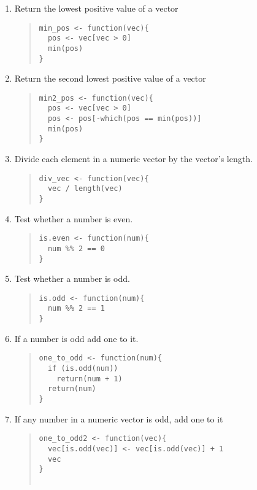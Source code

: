 \documentclass{article}
\begin{document}
\begin{enumerate}
\item Return the lowest positive value of a vector
  \begin{quote}
    \begin{verbatim}
min_pos <- function(vec){
  pos <- vec[vec > 0]
  min(pos)
}    
    \end{verbatim}
  \end{quote}

\item Return the second lowest positive value of a vector
  \begin{quote}
    \begin{verbatim}
min2_pos <- function(vec){
  pos <- vec[vec > 0]
  pos <- pos[-which(pos == min(pos))]
  min(pos)
}
    \end{verbatim}
  \end{quote}


\item Divide each element in a numeric vector by the vector's length.
  \begin{quote}
    \begin{verbatim}
div_vec <- function(vec){
  vec / length(vec)
}
    \end{verbatim}
  \end{quote}


\item Test whether a number is even.
  \begin{quote}
    \begin{verbatim}
is.even <- function(num){
  num %% 2 == 0
}

    \end{verbatim}
  \end{quote}
  
\item Test whether a number is odd.
  \begin{quote}
    \begin{verbatim}
is.odd <- function(num){
  num %% 2 == 1
}
    \end{verbatim}
  \end{quote}

\item If a number is odd add one to it.
  \begin{quote}
    \begin{verbatim}
one_to_odd <- function(num){
  if (is.odd(num))
    return(num + 1)
  return(num)
} 
    \end{verbatim}
  \end{quote}

\item If any number in a numeric vector is odd, add one to it
  \begin{quote}
    \begin{verbatim}
one_to_odd2 <- function(vec){
  vec[is.odd(vec)] <- vec[is.odd(vec)] + 1
  vec
}	


\end{verbatim}
\end{quote}
\end{enumerate}
\end{document}
